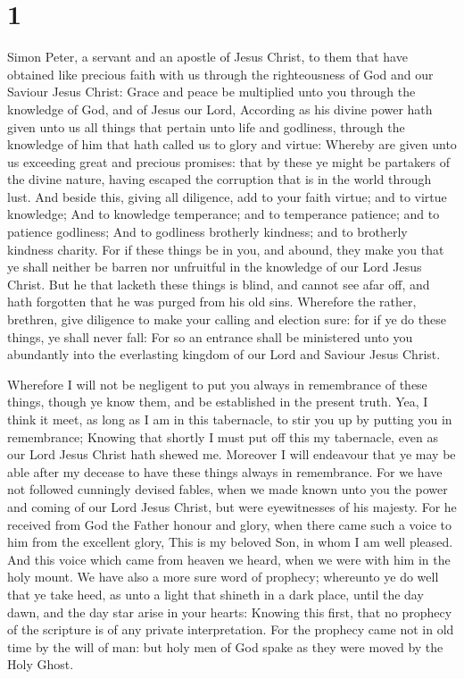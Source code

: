 \hypertarget{section}{%
\section{1}\label{section}}

 Simon Peter, a servant and an apostle of Jesus Christ, to
them that have obtained like precious faith with us through the
righteousness of God and our Saviour Jesus Christ:  Grace
and peace be multiplied unto you through the knowledge of God, and of
Jesus our Lord,  According as his divine power hath given
unto us all things that pertain unto life and godliness, through the
knowledge of him that hath called us to glory and virtue: 
Whereby are given unto us exceeding great and precious promises: that by
these ye might be partakers of the divine nature, having escaped the
corruption that is in the world through lust.  And beside
this, giving all diligence, add to your faith virtue; and to virtue
knowledge;  And to knowledge temperance; and to temperance
patience; and to patience godliness;  And to godliness
brotherly kindness; and to brotherly kindness charity. 
For if these things be in you, and abound, they make you that ye shall
neither be barren nor unfruitful in the knowledge of our Lord Jesus
Christ.  But he that lacketh these things is blind, and
cannot see afar off, and hath forgotten that he was purged from his old
sins.  Wherefore the rather, brethren, give diligence to
make your calling and election sure: for if ye do these things, ye shall
never fall:  For so an entrance shall be ministered unto
you abundantly into the everlasting kingdom of our Lord and Saviour
Jesus Christ.

 Wherefore I will not be negligent to put you always in
remembrance of these things, though ye know them, and be established in
the present truth.  Yea, I think it meet, as long as I am
in this tabernacle, to stir you up by putting you in remembrance;
 Knowing that shortly I must put off this my tabernacle,
even as our Lord Jesus Christ hath shewed me.  Moreover I
will endeavour that ye may be able after my decease to have these things
always in remembrance.  For we have not followed
cunningly devised fables, when we made known unto you the power and
coming of our Lord Jesus Christ, but were eyewitnesses of his majesty.
 For he received from God the Father honour and glory,
when there came such a voice to him from the excellent glory, This is my
beloved Son, in whom I am well pleased.  And this voice
which came from heaven we heard, when we were with him in the holy
mount.  We have also a more sure word of prophecy;
whereunto ye do well that ye take heed, as unto a light that shineth in
a dark place, until the day dawn, and the day star arise in your hearts:
 Knowing this first, that no prophecy of the scripture is
of any private interpretation.  For the prophecy came not
in old time by the will of man: but holy men of God spake as they were
moved by the Holy Ghost.

